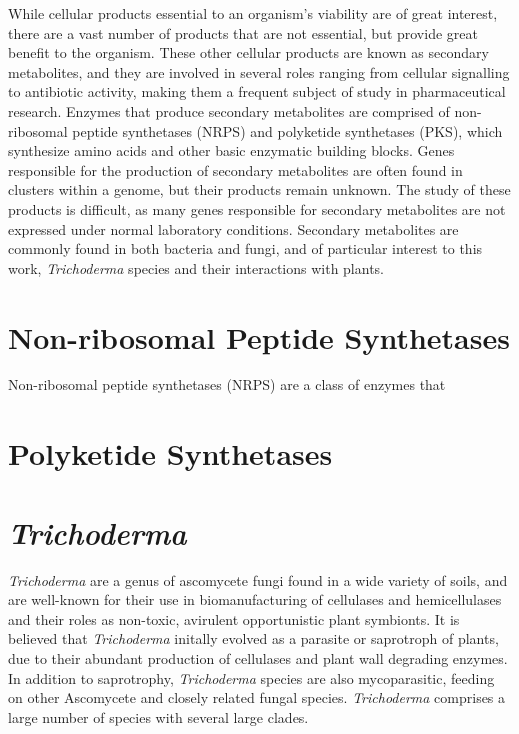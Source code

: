 While cellular products essential to an organism's viability are
of great interest, there are a vast number of products that are not
essential, but provide great benefit to the
organism\cite{Craney2013}\cite{Mukherjee2012}. These other cellular products are known as secondary metabolites, and they are involved in several roles ranging from cellular signalling to antibiotic activity, making them a frequent subject of study in pharmaceutical research. Enzymes that produce secondary metabolites are comprised of non-ribosomal peptide synthetases (NRPS) and polyketide synthetases (PKS), which synthesize amino acids and other basic enzymatic building blocks\cite{Komaki2020}. Genes responsible for the production of secondary metabolites are often found in clusters within a genome, but their products remain unknown\cite{Mukherjee2012}. The study of these products is difficult, as many genes responsible for secondary metabolites are not expressed under normal laboratory conditions\cite{Mukherjee2012}.  Secondary metabolites are commonly found in both bacteria and fungi, and of particular interest to this work, \textit{Trichoderma} species and their interactions with plants.


\section{Non-ribosomal Peptide Synthetases}

Non-ribosomal peptide synthetases (NRPS) are a class of enzymes that


\section{Polyketide Synthetases}


\section{\textit{Trichoderma}}

\textit{Trichoderma} are a genus of ascomycete fungi found in a wide
variety of soils, and are well-known for their use in biomanufacturing
of cellulases and hemicellulases and their roles as non-toxic,
avirulent opportunistic plant
symbionts\cite{Woo2023}\cite{Kubicek2019}. It is believed that
\textit{Trichoderma} initally evolved as a parasite or saprotroph of
plants, due to their abundant production of cellulases and plant wall
degrading enzymes\cite{Kubicek2019}. In addition to saprotrophy,
\textit{Trichoderma} species are also mycoparasitic, feeding on other
Ascomycete and closely related fungal
species\cite{Druzhinina2018}. \textit{Trichoderma} comprises a large
number of species with several large clades.

